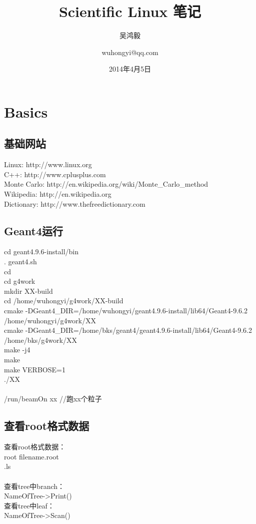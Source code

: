 \documentclass[11pt,a4paper,titlepage]{article}
\title{\Huge {Scientific Linux 笔记}}
\author{\kai 吴鸿毅 \and wuhongyi@qq.com}
\date{2014年4月5日}
\begin{document}
\maketitle%
\tableofcontents%
\newpage%

\section{Basics}%
\subsection{\kai 基础网站}
Linux: http://www.linux.org\\
C++: http://www.cplusplus.com\\
Monte Carlo: http://en.wikipedia.org/wiki/Monte\_Carlo\_method\\
Wikipedia: http://en.wikipedia.org\\
Dictionary: http://www.thefreedictionary.com\\

\subsection{\kai Geant4运行}
cd geant4.9.6-install/bin\\
. geant4.sh\\
cd\\
cd g4work\\
mkdir XX-build\\
cd /home/wuhongyi/g4work/XX-build\\
cmake -DGeant4\_DIR=/home/wuhongyi/geant4.9.6-install/lib64/Geant4-9.6.2 /home/wuhongyi/g4work/XX\\
cmake -DGeant4\_DIR=/home/bks/geant4/geant4.9.6-install/lib64/Geant4-9.6.2 /home/bks/g4work/XX\\
make -j4\\
make\\
make VERBOSE=1\\
./XX\\
\\
/run/beamOn xx      //跑xx个粒子\\

\subsection{\kai 查看root格式数据}
查看root格式数据：\\
root filename.root\\
.ls\\
\\
查看tree中branch：\\
NameOfTree->Print()\\
查看tree中leaf：\\
NameOfTree->Scan()\\
\end{document}
